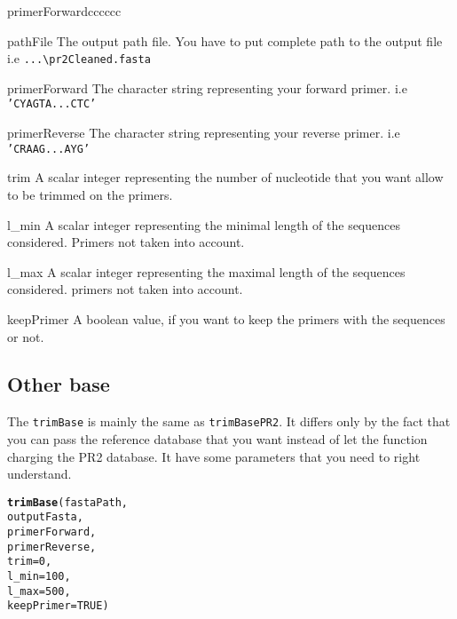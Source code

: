 \documentclass{article}\usepackage[]{graphicx}\usepackage[]{color}
\makeatletter
\newcommand{\hlnum}[1]{\textcolor[rgb]{0.686,0.059,0.569}{#1}}%
\newcommand{\hlstd}[1]{\textcolor[rgb]{0.345,0.345,0.345}{#1}}%
\newcommand{\hlkwc}[1]{\textcolor[rgb]{0.333,0.667,0.333}{#1}}%
\newcommand{\hlkwd}[1]{\textcolor[rgb]{0.737,0.353,0.396}{\textbf{#1}}}%
\newenvironment{kframe}{%
 \def\at@end@of@kframe{}%
 \ifinner\ifhmode%
  \def\at@end@of@kframe{\end{minipage}}%
  \begin{minipage}{\columnwidth}%
 \fi\fi%
 \def\FrameCommand##1{\hskip\@totalleftmargin \hskip-\fboxsep
 \colorbox{shadecolor}{##1}\hskip-\fboxsep
     \hskip-\linewidth \hskip-\@totalleftmargin \hskip\columnwidth}%
 \MakeFramed {\advance\hsize-\width
   \@totalleftmargin\z@ \linewidth\hsize
   \@setminipage}}%
 {\par\unskip\endMakeFramed%
 \at@end@of@kframe}
\newenvironment{knitrout}{}{} %
\makeatother
\begin{document}
\begin{labeling}{primerForwardcccccc}
	\item [pathFile] The output path file. You have to put complete path to the output file\\ i.e \texttt{...\textbackslash pr2Cleaned.fasta}
	\item [primerForward] The character string representing your forward primer. i.e \texttt{'CYAGTA...CTC'}
	\item [primerReverse] The character string representing your reverse primer. i.e \texttt{'CRAAG...AYG'}
	\item [trim] A scalar integer representing the number of nucleotide that you want allow to be trimmed on the primers.
	\item [l\_min] A scalar integer representing the minimal length of the sequences considered. Primers not taken into account.
	\item [l\_max] A scalar integer representing the maximal length of the sequences considered. primers not taken into account.
	\item [keepPrimer] A boolean value, if you want to keep the primers with the sequences or not.
\end{labeling}

\subsection{Other base}


The \texttt{trimBase} is mainly the same as \texttt{trimBasePR2}. It differs only by the fact that you can pass the reference database that you want instead of let the function charging the PR2 database. It have some parameters that you need to right understand.
\begin{knitrout}
\color{fgcolor}\begin{kframe}
\begin{alltt}
\hlkwd{trimBase}\hlstd{(fastaPath,}
        \hlstd{outputFasta,}
        \hlstd{primerForward,}
        \hlstd{primerReverse,}
        \hlkwc{trim} \hlstd{=} \hlnum{0}\hlstd{,}
        \hlkwc{l_min} \hlstd{=} \hlnum{100}\hlstd{,}
        \hlkwc{l_max} \hlstd{=} \hlnum{500}\hlstd{,}
        \hlkwc{keepPrimer} \hlstd{=} \hlnum{TRUE}\hlstd{)}
\end{alltt}
\end{kframe}
\end{knitrout}
\end{document}
